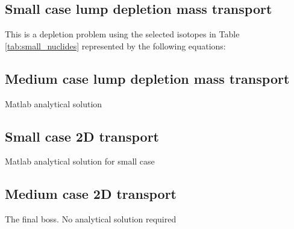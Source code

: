 \subsection{Small case lump depletion mass transport}
This is a depletion problem using the selected isotopes in Table \ref{tab:small_nuclides} represented by the following equations:


\subsection{Medium case lump depletion mass transport}
Matlab analytical solution

\subsection{Small case 2D transport}
Matlab analytical solution for small case 

\subsection{Medium case 2D transport}
The final boss. No analytical solution required
